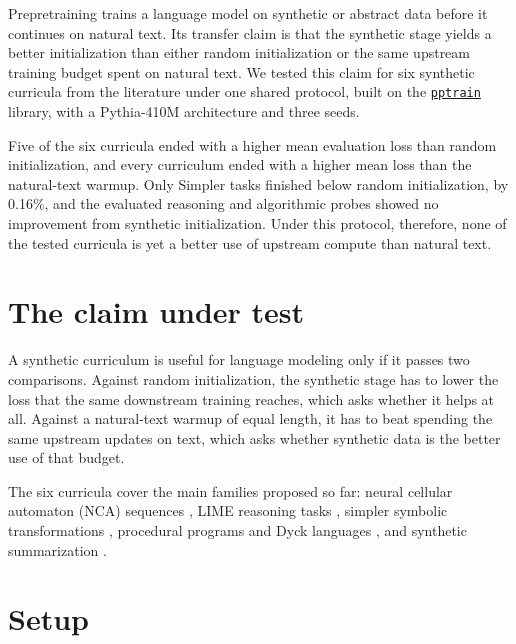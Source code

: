 \documentclass[11pt]{article}
\begin{document}

\begin{publicationhead}
\makepublicationtitle
\end{publicationhead}

Prepretraining trains a language model on synthetic or abstract data before it continues on natural text. Its transfer claim is that the synthetic stage yields a better initialization than either random initialization or the same upstream training budget spent on natural text. We tested this claim for six synthetic curricula from the literature under one shared protocol, built on the \href{https://github.com/Axym-Labs/pptrain}{\texttt{pptrain}} library, with a Pythia-410M architecture and three seeds.

Five of the six curricula ended with a higher mean evaluation loss than random initialization, and every curriculum ended with a higher mean loss than the natural-text warmup. Only Simpler tasks finished below random initialization, by 0.16\%, and the evaluated reasoning and algorithmic probes showed no improvement from synthetic initialization. Under this protocol, therefore, none of the tested curricula is yet a better use of upstream compute than natural text.

\section{The claim under test}\label{claim}

A synthetic curriculum is useful for language modeling only if it passes two comparisons. Against random initialization, the synthetic stage has to lower the loss that the same downstream training reaches, which asks whether it helps at all. Against a natural-text warmup of equal length, it has to beat spending the same upstream updates on text, which asks whether synthetic data is the better use of that budget.

The six curricula cover the main families proposed so far: neural cellular automaton (NCA) sequences \cite{lee2026}, LIME reasoning tasks \cite{wu2021}, simpler symbolic transformations \cite{wu2022}, procedural programs and Dyck languages \cite{jiang2026}, and synthetic summarization \cite{krishna2021}.

\section{Setup}\label{setup}
\end{document}
